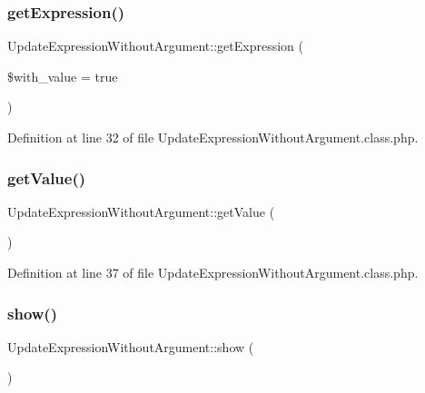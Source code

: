 \hypertarget{classUpdateExpressionWithoutArgument_a26520d45130223bf455d335c6187a769}{}\label{classUpdateExpressionWithoutArgument_a26520d45130223bf455d335c6187a769} 
\subsubsection{\texorpdfstring{get\+Expression()}{getExpression()}}
{\footnotesize\ttfamily Update\+Expression\+Without\+Argument\+::get\+Expression (\begin{DoxyParamCaption}\item[{}]{\$with\+\_\+value = {\ttfamily true} }\end{DoxyParamCaption})}



Definition at line 32 of file Update\+Expression\+Without\+Argument.\+class.\+php.

\hypertarget{classUpdateExpressionWithoutArgument_a901f3b067ddafc55479d2728cb1b5ef2}{}\label{classUpdateExpressionWithoutArgument_a901f3b067ddafc55479d2728cb1b5ef2} 
\subsubsection{\texorpdfstring{get\+Value()}{getValue()}}
{\footnotesize\ttfamily Update\+Expression\+Without\+Argument\+::get\+Value (\begin{DoxyParamCaption}{ }\end{DoxyParamCaption})}



Definition at line 37 of file Update\+Expression\+Without\+Argument.\+class.\+php.

\hypertarget{classUpdateExpressionWithoutArgument_a01a16802a0645ae717c010ede1b92f7e}{}\label{classUpdateExpressionWithoutArgument_a01a16802a0645ae717c010ede1b92f7e} 
\subsubsection{\texorpdfstring{show()}{show()}}
{\footnotesize\ttfamily Update\+Expression\+Without\+Argument\+::show (\begin{DoxyParamCaption}{ }\end{DoxyParamCaption})}




